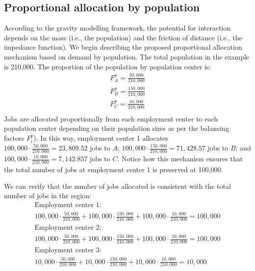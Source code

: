 \documentclass[]{elsarticle} %
\begin{document}
\hypertarget{proportional-allocation-by-population}{%
\subsection{Proportional allocation by
population}\label{proportional-allocation-by-population}}

According to the gravity modelling framework, the potential for
interaction depends on the mass (i.e., the population) and the friction
of distance (i.e., the impedance function). We begin describing the
proposed proportional allocation mechanism based on demand by
population. The total population in the example is 210,000. The
proportion of the population by population center is: \[
\begin{array}{l}
F^p_A = \frac{50,000}{210,000}\\
F^p_B = \frac{150,000}{210,000}\\
F^p_C = \frac{10,000}{210,000}\\
\end{array}
\] Jobs are allocated proportionally from each employment center to each
population center depending on their population sizes as per the
balancing factors \(F^p_i\)). In this way, employment center 1 allocates
\(100,000\cdot \frac{50,000}{210,000}= 23,809.52\) jobs to \(A\);
\(100,000\cdot \frac{150,000}{210,000}= 71,428.57\) jobs to \(B\); and
\(100,000\cdot \frac{10,000}{210,000}= 7,142.857\) jobs to \(C\). Notice
how this mechanism ensures that the total number of jobs at employment
center 1 is preserved at 100,000.

We can verify that the number of jobs allocated is consistent with the
total number of jobs in the region: \[
\begin{array}{l}
\text{Employment center 1: }\\
100,000 \cdot \frac{50,000}{210,000} + 100,000 \cdot \frac{150,000}{210,000} + 100,000 \cdot \frac{10,000}{210,000} = 100,000\\
\text{Employment center 2: }\\
100,000 \cdot \frac{50,000}{210,000} + 100,000 \cdot \frac{150,000}{210,000} + 100,000 \cdot \frac{10,000}{210,000} = 100,000\\
\text{Employment center 3: }\\
10,000 \cdot \frac{50,000}{210,000} + 10,000 \cdot \frac{150,000}{210,000} + 10,000 \cdot \frac{10,000}{210,000} = 10,000\\
\end{array}
\]
\end{document}
